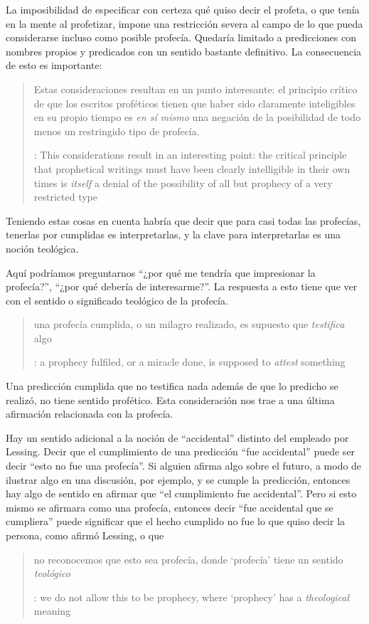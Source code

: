 La imposibilidad de especificar con certeza qué quiso decir el profeta, o que
tenía en la mente al profetizar, impone una restricción severa al campo de lo
que pueda considerarse incluso como posible profecía. Quedaría limitado a
predicciones con nombres propios y predicados con un sentido bastante
definitivo. La consecuencia de esto es importante:
\blockquote[{\cite[31]{anscombe2008faith:prophandmi}}: This considerations
result in an interesting point: the critical principle that prophetical writings
must have been clearly intelligible in their own times is \emph{itself} a denial
of the possibility of all but prophecy of a very restricted type]{Estas
  consideraciones resultan en un punto interesante: el principio crítico de que
  los escritos proféticos tienen que haber sido claramente inteligibles en su
  propio tiempo es \emph{en sí mismo} una negación de la posibilidad de todo
  menos un restringido tipo de profecía.}
Teniendo estas cosas en cuenta habría que decir que para casi todas las
profecías, tenerlas por cumplidas es interpretarlas, y la clave para
interpretarlas es una noción teológica.

Aquí podríamos preguntarnos \enquote{¿por qué me tendría que impresionar la
  profecía?}, \enquote{¿por qué debería de interesarme?}. La respuesta a esto
tiene que ver con el sentido o significado teológico de la profecía.
\blockquote[{\cite[32]{anscombe2008faith:prophandmi}}: a prophecy fulfiled, or a
miracle done, is supposed to \emph{attest} something]{una profecía cumplida, o
  un milagro realizado, es supuesto que \emph{testifica} algo}. Una predicción
cumplida que no testifica nada además de que lo predicho se realizó, no tiene
sentido profético. Esta consideración nos trae a una última afirmación
relacionada con la profecía.

Hay un sentido adicional a la noción de \enquote{accidental} distinto del
empleado por Lessing. Decir que el cumplimiento de una predicción \enquote{fue
  accidental} puede ser decir \enquote {esto no fue una profecía}. Si alguien
afirma algo sobre el futuro, a modo de ilustrar algo en una discusión, por
ejemplo, y se cumple la predicción, entonces hay algo de sentido en afirmar que
\enquote{el cumplimiento fue accidental}. Pero si esto mismo se afirmara como
una profecía, entonces decir \enquote{fue accidental que se cumpliera} puede
significar que el hecho cumplido no fue lo que quiso decir la persona, como
afirmó Lessing, o que \blockquote[{\cite[34]{anscombe2008faith:prophandmi}}: we
do not allow this to be prophecy, where `prophecy' has a \emph{theological}
meaning]{no reconocemos que esto sea profecía, donde `profecía' tiene un sentido
  \emph{teológico}}.

